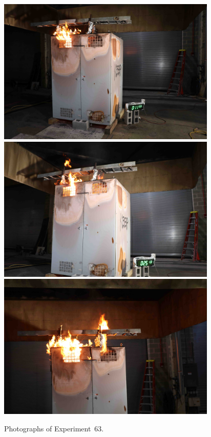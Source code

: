 \documentclass[12pt]{article}
\begin{document}
\begin{figure}[p]
\centering
\includegraphics[height=2.75in]{../FIGURES/Test_63_11_min_59_s} \\
\includegraphics[height=2.75in]{../FIGURES/Test_63_25_min_13_s} \\
\includegraphics[height=2.75in]{../FIGURES/Test_63_ignition}
\caption[Photographs of Experiment~63]{Photographs of Experiment~63.}
\label{fig:Test_63_photos}
\end{figure}


\clearpage
\end{document}
